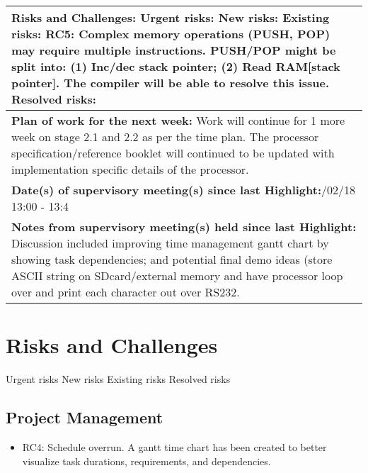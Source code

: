 \documentclass[11pt,a4paper]{article}
\begin{document}
\begin{table}[H]
\begin{tabularx}{\textwidth}{|X|}
	\\ \hline
	\textbf{Risks and Challenges:}\newline
	{\color{red} Urgent risks:}\newline
	{\color{orange} New risks:}\newline
	{\color{purple} Existing risks:\newline
	RC5: Complex memory operations (PUSH, POP) may require multiple instructions. PUSH/POP might be split into: (1) Inc/dec stack pointer; (2) Read RAM[stack pointer]. The compiler will be able to resolve this issue.}\newline
	{\color{gray} Resolved risks:}
	\\ \hline
	\textbf{Plan of work for the next week:}\newline
	Work will continue for 1 more week on stage 2.1 and 2.2 as per the time plan.
	\newline
	The processor specification/reference booklet will continued to be updated with implementation specific details of the processor.
	\\ \hline
	\textbf{Date(s) of supervisory meeting(s) since last Highlight:}\newline
	21/02/18 13:00 - 13:4
	\\ \hline
	\textbf{Notes from supervisory meeting(s) held since last Highlight:}\newline
	Discussion included improving time management gantt chart by showing task dependencies; and potential final demo ideas (store ASCII string on SDcard/external memory and have processor loop over and print each character out over RS232.
	\\ \hline
    \end{tabularx}
\end{table}


\newpage
\section{Risks and Challenges}
{\color{red} Urgent risks}\newline
{\color{orange} New risks}\newline
{\color{purple} Existing risks}\newline
{\color{gray} Resolved risks}

\subsection{Project Management}
\begin{itemize}
\item{{\color{gray} RC4: Schedule overrun. A gantt time chart has been created to better visualize task durations, requirements, and dependencies.}}
\end{itemize}
\end{document}
